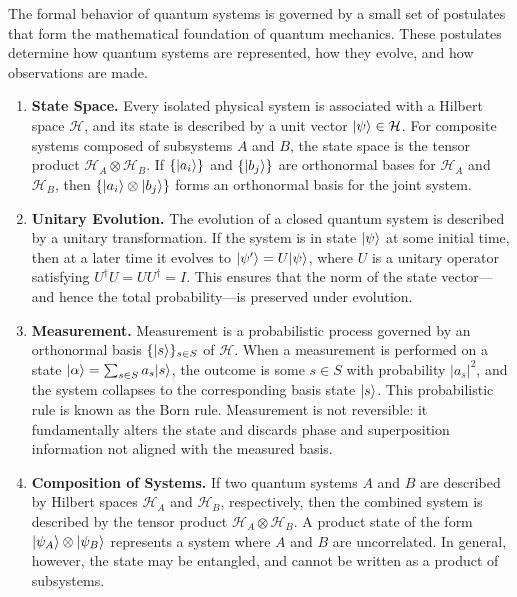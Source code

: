 \documentclass[12pt]{report}
\begin{document}
The formal behavior of quantum systems is governed by a small set of postulates that form the mathematical foundation of quantum mechanics. These postulates determine how quantum systems are represented, how they evolve, and how observations are made.

\begin{enumerate}
  \item \textbf{State Space.} Every isolated physical system is associated with a Hilbert space $\mathcal{H}$, and its state is described by a unit vector $\lvert\psi\rangle \in \mathcal{H}$. For composite systems composed of subsystems $A$ and $B$, the state space is the tensor product $\mathcal{H}_A \otimes \mathcal{H}_B$. If $\{\lvert a_i\rangle\}$ and $\{\lvert b_j\rangle\}$ are orthonormal bases for $\mathcal{H}_A$ and $\mathcal{H}_B$, then $\{\lvert a_i\rangle \otimes \lvert b_j\rangle\}$ forms an orthonormal basis for the joint system.

  \item \textbf{Unitary Evolution.} The evolution of a closed quantum system is described by a unitary transformation. If the system is in state $\lvert\psi\rangle$ at some initial time, then at a later time it evolves to $\lvert\psi'\rangle = U \lvert\psi\rangle$, where $U$ is a unitary operator satisfying $U^\dagger U = U U^\dagger = I$. This ensures that the norm of the state vector—and hence the total probability—is preserved under evolution.

  \item \textbf{Measurement.} Measurement is a probabilistic process governed by an orthonormal basis $\{\lvert s\rangle\}_{s \in S}$ of $\mathcal{H}$. When a measurement is performed on a state $\lvert\alpha\rangle = \sum_{s \in S} a_s \lvert s\rangle$, the outcome is some $s \in S$ with probability $|a_s|^2$, and the system collapses to the corresponding basis state $\lvert s\rangle$. This probabilistic rule is known as the Born rule. Measurement is not reversible: it fundamentally alters the state and discards phase and superposition information not aligned with the measured basis.

  \item \textbf{Composition of Systems.} If two quantum systems \( A \) and \( B \) are described by Hilbert spaces \( \mathcal{H}_A \) and \( \mathcal{H}_B \), respectively, then the combined system is described by the tensor product \( \mathcal{H}_A \otimes \mathcal{H}_B \). A product state of the form \( \lvert\psi_A\rangle \otimes \lvert\psi_B\rangle \) represents a system where \( A \) and \( B \) are uncorrelated. In general, however, the state may be entangled, and cannot be written as a product of subsystems.


\end{enumerate}
\end{document}
